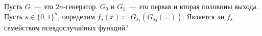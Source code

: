 Пусть $G$~--- это $2n$-генератор. $G_0$ и $G_1$~--- это первая и вторая половины выхода. Пусть
$s \in \{0, 1\}^n$, определим $f_s(x) \coloneqq G_{s_1}(G_{s_2}(\dots))$. Является ли $f_s$ семейством
псевдослучайных функций?
